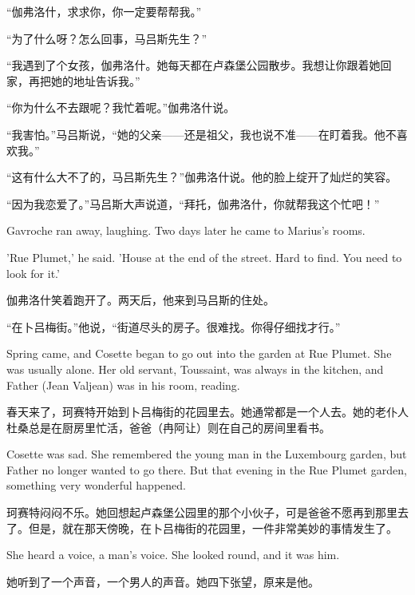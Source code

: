 \documentclass[fontset=ubuntu, zihao=5]{ctexart}
\begin{document}
\begin{paracol}{2}
“伽弗洛什，求求你，你一定要帮帮我。”


“为了什么呀？怎么回事，马吕斯先生？”

“我遇到了个女孩，伽弗洛什。她每天都在卢森堡公园散步。我想让你跟着她回家，再把她的地址告诉我。”

“你为什么不去跟呢？我忙着呢。”伽弗洛什说。

“我害怕。”马吕斯说，“她的父亲——还是祖父，我也说不准——在盯着我。他不喜欢我。”

“这有什么大不了的，马吕斯先生？”伽弗洛什说。他的脸上绽开了灿烂的笑容。

“因为我恋爱了。”马吕斯大声说道，“拜托，伽弗洛什，你就帮我这个忙吧！”
\switchcolumn*

Gavroche ran away, laughing. Two days later he came to Marius's rooms.

'Rue Plumet,' he said. 'House at the end of the street. Hard to find. You need to look for it.'

\switchcolumn

伽弗洛什笑着跑开了。两天后，他来到马吕斯的住处。


“在卜吕梅街。”他说，“街道尽头的房子。很难找。你得仔细找才行。”

\switchcolumn*

Spring came, and Cosette began to go out into the garden at Rue Plumet. She was usually alone. Her old servant, Toussaint, was always in the kitchen, and Father (Jean Valjean) was in his room, reading.

\switchcolumn

春天来了，珂赛特开始到卜吕梅街的花园里去。她通常都是一个人去。她的老仆人杜桑总是在厨房里忙活，爸爸（冉阿让）则在自己的房间里看书。

\switchcolumn*

Cosette was sad. She remembered the young man in the Luxembourg garden, but Father no longer wanted to go there. But that evening in the Rue Plumet garden, something very wonderful happened.

\switchcolumn

珂赛特闷闷不乐。她回想起卢森堡公园里的那个小伙子，可是爸爸不愿再到那里去了。但是，就在那天傍晚，在卜吕梅街的花园里，一件非常美妙的事情发生了。

\switchcolumn*

She heard a voice, a man's voice. She looked round, and it was him.

\switchcolumn

她听到了一个声音，一个男人的声音。她四下张望，原来是他。


\end{paracol}
\end{document}
